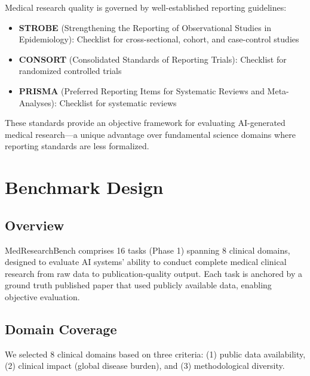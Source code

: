 \documentclass[12pt]{article}
\begin{document}
Medical research quality is governed by well-established reporting guidelines:

\begin{itemize}
\item \textbf{STROBE} (Strengthening the Reporting of Observational Studies in Epidemiology): Checklist for cross-sectional, cohort, and case-control studies
\item \textbf{CONSORT} (Consolidated Standards of Reporting Trials): Checklist for randomized controlled trials
\item \textbf{PRISMA} (Preferred Reporting Items for Systematic Reviews and Meta-Analyses): Checklist for systematic reviews
\end{itemize}

These standards provide an objective framework for evaluating AI-generated medical research---a unique advantage over fundamental science domains where reporting standards are less formalized.

\section{Benchmark Design}

\subsection{Overview}

MedResearchBench comprises 16 tasks (Phase 1) spanning 8 clinical domains, designed to evaluate AI systems' ability to conduct complete medical clinical research from raw data to publication-quality output. Each task is anchored by a ground truth published paper that used publicly available data, enabling objective evaluation.

\subsection{Domain Coverage}

We selected 8 clinical domains based on three criteria: (1) public data availability, (2) clinical impact (global disease burden), and (3) methodological diversity.
\end{document}
